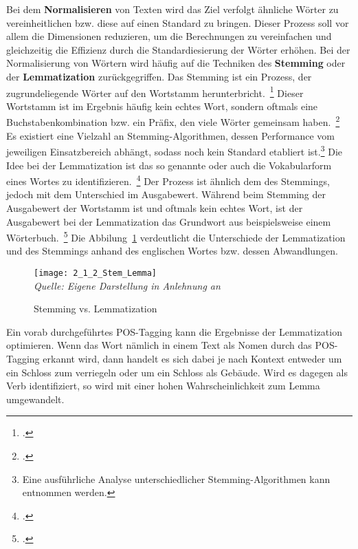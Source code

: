 Bei dem \textbf{Normalisieren} von Texten wird das Ziel verfolgt ähnliche Wörter zu vereinheitlichen bzw.
diese auf einen Standard zu bringen.
Dieser Prozess soll vor allem die Dimensionen reduzieren, um die Berechnungen zu vereinfachen und gleichzeitig die
Effizienz durch die Standardiesierung der Wörter erhöhen.
\newline
Bei der Normalisierung von Wörtern wird häufig auf die Techniken des \textbf{Stemming} oder der \textbf{Lemmatization}
zurückgegriffen.
Das Stemming ist ein Prozess, der zugrundeliegende Wörter auf den Wortstamm herunterbricht.~\footcite[\vglf][]
{khyani.2021}
Dieser Wortstamm ist im Ergebnis häufig kein echtes Wort, sondern oftmals eine Buchstabenkombination bzw.
ein Präfix, den viele Wörter gemeinsam haben.~\footcite[\vglf][]{khyani.2021}
Es existiert eine Vielzahl an Stemming-Algorithmen, dessen Performance vom jeweiligen Einsatzbereich abhängt, sodass
noch kein Standard etabliert ist.\footnote{Eine ausführliche Analyse unterschiedlicher Stemming-Algorithmen kann{}
\cite{jivani.2011} entnommen werden.}
\newline
Die Idee bei der Lemmatization ist das so genannte \grqq{} oder auch die Vokabularform eines Wortes
zu identifizieren.~\footcite[\vglf][]{khyani.2021}
Der Prozess ist ähnlich dem des Stemmings, jedoch mit dem Unterschied im Ausgabewert.
Während beim Stemming der Ausgabewert der Wortstamm ist und oftmals kein echtes Wort,
ist der Ausgabewert bei der Lemmatization das Grundwort aus beispielsweise einem Wörterbuch.~\footcite[\vglf]
[]{khyani.2021}
Die Abbilung~\ref{fig:2_1_2_Stem_Lemma} verdeutlicht die Unterschiede der Lemmatization und des Stemmings anhand
des englischen Wortes \grqq{} bzw.
dessen Abwandlungen.

\begin{figure}[H]
    \caption{Stemming vs. Lemmatization}\label{fig:2_1_2_Stem_Lemma}
    \texttt{[image: 2\_1\_2\_Stem\_Lemma]}
    \\
    \textit{Quelle: Eigene Darstellung in Anlehnung an}~\cite[]{khyani.2021}
\end{figure}
Ein vorab durchgeführtes \ac{POS}-Tagging kann die Ergebnisse der Lemmatization optimieren.
Wenn das Wort \grqq{} nämlich in einem Text als Nomen durch das \ac{POS}-Tagging erkannt wird,
dann handelt es sich dabei je nach Kontext entweder um ein Schloss zum verriegeln oder um ein Schloss als Gebäude.
Wird es dagegen als Verb identifiziert, so wird mit einer hohen Wahrscheinlichkeit zum Lemma \grqq
umgewandelt.

